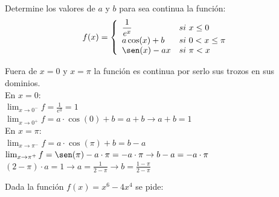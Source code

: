\documentclass[addpoints,spanish, 12pt,a4paper]{exam}
\begin{document}
\begin{questions}

%
%
%

\question[2] Determine los valores de $a$ y $b$ para sea
continua la función:
$$f(x)=\left\{\begin{array}{ll}
\dfrac{1}{e^x} & si \ x\leq 0 \\
a\cos(x) + b & si \  0 < x \leq \pi \\
\sen(x)-ax & si \ \pi<x
\end{array}\right.$$
\begin{solution}
Fuera de $x=0$ y $x=\pi$ la función es continua por serlo sus trozos en sus dominios. \\

En $x=0$: \\
$\lim_{x \to 0^-}f=\frac{1}{e^0}=1$\\
$\lim_{x \to 0^+}f=a\cdot \cos(0) +b =a+b \to a+b=1$\\

En $x=\pi$: \\
$\lim_{x \to \pi^-}f=a\cdot \cos(\pi) +b =b-a$\\
$\lim_{x \to \pi^+}f=\sen(\pi) - a\cdot \pi =- a\cdot \pi \to b-a=-a\cdot \pi$\\

$(2-\pi)\cdot a= 1 \to a=\frac{1}{2- \pi} \to b=\frac{1-\pi}{2-\pi}$

\end{solution}

\question Dada la función $f(x)= x^6-4x^4$ se pide:
\end{questions}
\end{document}
